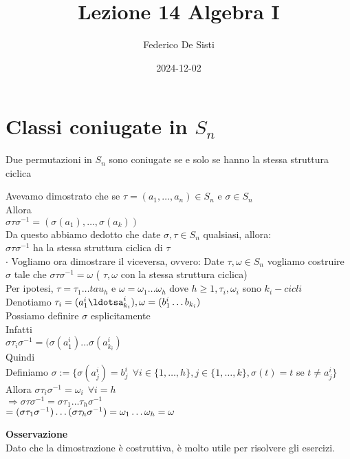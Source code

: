 \documentclass[12px]{article}
\title{Lezione 14 Algebra I}
\date{2024-12-02}
\author{Federico De Sisti}
\begin{document}
	\maketitle
	\newpage
	\section{Classi coniugate in $S_n$}
	\begin{teo}[Fondamentale]
		Due permutazioni in $S_n$ sono coniugate se e solo se hanno la stessa struttura ciclica
	\end{teo}
	\begin{dimo}
		Avevamo dimostrato che se $\tau = (a_1, \ldots, a_n)\in S_n$ e $\sigma\in S_n$\\
		 Allora\\
		 $\sigma\tau\sigma^{-1} = (\sigma (a_1), \ldots, \sigma (a_k))$\\
		 Da questo abbiamo dedotto che date $\sigma, \tau\in S_n$  qualsiasi, allora:\\
		 $\sigma\tau\sigma^{-1}$ ha la stessa struttura ciclica di $\tau$\\
		 $\cdot$ Vogliamo ora dimostrare il viceversa, ovvero: Date $\tau,\omega\in S_n$ vogliamo costruire  $\sigma$ tale che $\sigma\tau\sigma^{-1} = \omega$ ( $\tau,\omega$ con la stessa struttura ciclica)\\
		 Per ipotesi, $\tau = \tau_1\ldots tau_h$ e $\omega = \omega_1\ldots\omega_h$ dove $h\geq 1, \tau_i,\omega_i$ sono  $k_i-cicli$\\
		 Denotiamo  $\tau_i = (a_1^i\ldotsa^i_{k_i}), \omega = (b_1^i\ldots b_{k_i})$\\
		 Possiamo definire $\sigma$ esplicitamente\\
		 Infatti\\
		 $\sigma\tau_i\sigma^{-1} = (\sigma(a_1^i)\ldots\sigma(a_{k_i}^i)$\\
		 Quindi\\
		 Definiamo $\sigma := \{\sigma (a_j^i) = b_j^i \ \ \forall i\in\{1,\ldots, h\}, j\in \{1,\ldots,k\}, \sigma (t) = t $ se $t\neq a_j^i\}$\\
		 Allora $\sigma\tau_i\sigma^{-1} = \omega_i \ \ \forall i = h$\\
		 $ \Rightarrow \sigma\tau\sigma^{-1} = \sigma\tau_1\ldots\tau_h\sigma^{-1}$ \\
		 $= (\sigma\tau_1\sigma^{-1})\ldots(\sigma\tau_h\sigma^{-1})\\
		 =\omega_1\ldots\omega_h = \omega$
	\end{dimo}
	\textbf{Osservazione}\\
	Dato che la dimostrazione è costruttiva, è molto utile per risolvere gli esercizi.
\end{document}
